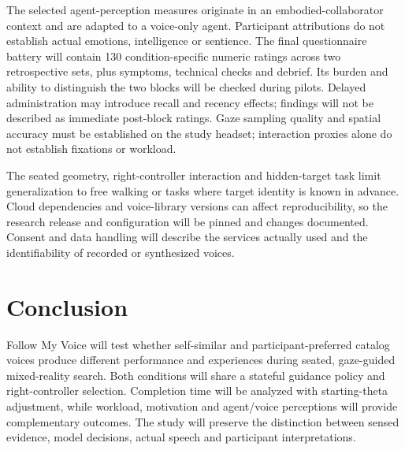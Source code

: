 \documentclass[11pt,letterpaper]{article}
\begin{document}
The selected agent-perception measures originate in an embodied-collaborator context and are adapted to a voice-only agent. Participant attributions do not establish actual emotions, intelligence or sentience. The final questionnaire battery will contain 130 condition-specific numeric ratings across two retrospective sets, plus symptoms, technical checks and debrief. Its burden and ability to distinguish the two blocks will be checked during pilots. Delayed administration may introduce recall and recency effects; findings will not be described as immediate post-block ratings. Gaze sampling quality and spatial accuracy must be established on the study headset; interaction proxies alone do not establish fixations or workload.

The seated geometry, right-controller interaction and hidden-target task limit generalization to free walking or tasks where target identity is known in advance. Cloud dependencies and voice-library versions can affect reproducibility, so the research release and configuration will be pinned and changes documented. Consent and data handling will describe the services actually used and the identifiability of recorded or synthesized voices.
\section{Conclusion}
Follow My Voice will test whether self-similar and participant-preferred catalog voices produce different performance and experiences during seated, gaze-guided mixed-reality search. Both conditions will share a stateful guidance policy and right-controller selection. Completion time will be analyzed with starting-theta adjustment, while workload, motivation and agent/voice perceptions will provide complementary outcomes. The study will preserve the distinction between sensed evidence, model decisions, actual speech and participant interpretations.


\end{document}
